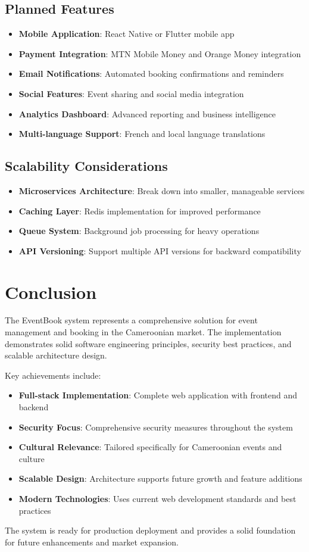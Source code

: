 \documentclass[12pt,a4paper]{article}
\begin{document}
\subsection{Planned Features}
\begin{itemize}
    \item \textbf{Mobile Application}: React Native or Flutter mobile app
    \item \textbf{Payment Integration}: MTN Mobile Money and Orange Money integration
    \item \textbf{Email Notifications}: Automated booking confirmations and reminders
    \item \textbf{Social Features}: Event sharing and social media integration
    \item \textbf{Analytics Dashboard}: Advanced reporting and business intelligence
    \item \textbf{Multi-language Support}: French and local language translations
\end{itemize}

\subsection{Scalability Considerations}
\begin{itemize}
    \item \textbf{Microservices Architecture}: Break down into smaller, manageable services
    \item \textbf{Caching Layer}: Redis implementation for improved performance
    \item \textbf{Queue System}: Background job processing for heavy operations
    \item \textbf{API Versioning}: Support multiple API versions for backward compatibility
\end{itemize}

\section{Conclusion}

The EventBook system represents a comprehensive solution for event management and booking in the Cameroonian market. The implementation demonstrates solid software engineering principles, security best practices, and scalable architecture design.

Key achievements include:
\begin{itemize}
    \item \textbf{Full-stack Implementation}: Complete web application with frontend and backend
    \item \textbf{Security Focus}: Comprehensive security measures throughout the system
    \item \textbf{Cultural Relevance}: Tailored specifically for Cameroonian events and culture
    \item \textbf{Scalable Design}: Architecture supports future growth and feature additions
    \item \textbf{Modern Technologies}: Uses current web development standards and best practices
\end{itemize}

The system is ready for production deployment and provides a solid foundation for future enhancements and market expansion.
\end{document}
